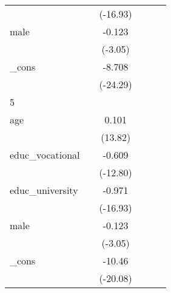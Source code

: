 {\begin{tabular}{l*{5}{c}}
            &                     &    (-16.93)         &                     &                     &                     \\
[1em]
male        &                     &      -0.123\sym{**} &                     &                     &                     \\
            &                     &     (-3.05)         &                     &                     &                     \\
[1em]
\_cons      &                     &      -8.708\sym{***}&                     &                     &                     \\
            &                     &    (-24.29)         &                     &                     &                     \\
\hline
5           &                     &                     &                     &                     &                     \\
age         &                     &       0.101\sym{***}&                     &                     &                     \\
            &                     &     (13.82)         &                     &                     &                     \\
[1em]
educ\_vocational&                     &      -0.609\sym{***}&                     &                     &                     \\
            &                     &    (-12.80)         &                     &                     &                     \\
[1em]
educ\_university&                     &      -0.971\sym{***}&                     &                     &                     \\
            &                     &    (-16.93)         &                     &                     &                     \\
[1em]
male        &                     &      -0.123\sym{**} &                     &                     &                     \\
            &                     &     (-3.05)         &                     &                     &                     \\
[1em]
\_cons      &                     &      -10.46\sym{***}&                     &                     &                     \\
            &                     &    (-20.08)         &                     &                     &                     \\

\end{tabular}}
